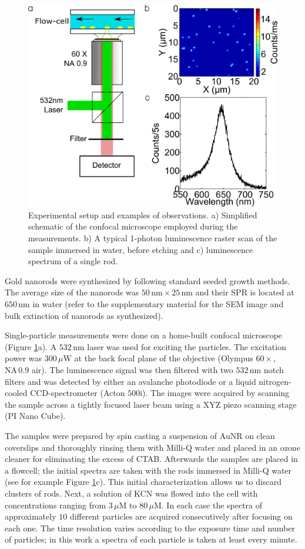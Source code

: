 \documentclass[a4paper,oneside,onecolumn]{article}
\newcommand{\nm}{\ensuremath{\,\textrm{nm}}}
\newcommand{\uM}{\ensuremath{\,\mu\textrm{M}}}
\newcommand{\uW}{\ensuremath{\,\mu\textrm{W}}}
\begin{document}
\begin{figure}[p]
 \centering \includegraphics[width=0.45\linewidth]{Figures/01_Setup/setup_1.png}
 \caption{Experimental setup and examples of observations. a) Simplified
 schematic of the confocal microscope employed during the measurements. b) A
 typical 1-photon luminescence raster scan of the sample immersed in
 water, before etching and c) luminescence spectrum of a single rod.}
 \label{fig:setup}
\end{figure}

Gold nanorods were synthesized by following standard seeded growth
methods\cite{Nikoobakht2003}. The average size of the nanorods was $50\nm\times
25\nm$ and their SPR is located at $650\nm$ in water (refer to the
supplementary material for the SEM image and bulk extinction of nanorods as
synthesized).

Single-particle measurements were done on a home-built confocal microscope
(Figure \ref{fig:setup}a). A $532\nm$ laser was used for exciting the particles.
The excitation power was $300\uW$ at the back focal plane of the objective
(Olympus $60\times$, $\textrm{NA}\,0.9$ air). The luminescence signal was then
filtered with two $532\nm$ notch filters and was detected by either an avalanche
photodiode or a liquid nitrogen-cooled CCD-spectrometer (Acton $500\textrm{i}$).
The images were acquired by scanning the sample across a tightly focused laser
beam using a XYZ piezo scanning stage (PI Nano Cube).

The samples were prepared by spin casting a suspension of AuNR on clean
coverslips and thoroughly rinsing them  with Milli-Q water and placed in an
ozone cleaner for eliminating the excess of CTAB. Afterwards the samples are
placed in a flowcell; the initial spectra are taken with the rods immersed in
Milli-Q water (see for example Figure \ref{fig:setup}c). This initial
characterization allows us to discard clusters of rods\cite{Funston2009}.
Next, a solution of KCN was flowed into the cell with concentrations ranging
from $3\uM$ to $80\uM$. In each case the spectra of approximately $10$
different particles are acquired consecutively after focusing on each one. The
time resolution varies according to the exposure time and number of particles;
in this work a spectra of each particle is taken at least every minute.
\end{document}

